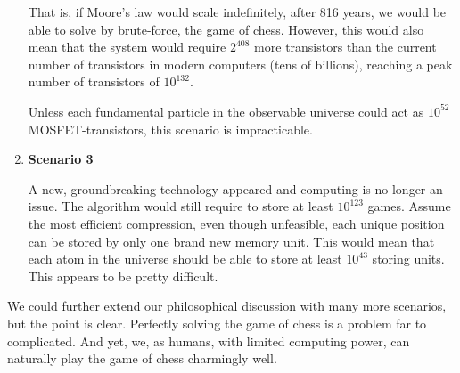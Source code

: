 \begin{enumerate}[label=\roman*]
That is, if Moore's law would scale indefinitely, after 816 years, we would be able to solve by brute-force, the game of chess. However, this would also mean that the system would require $2^{408}$ more transistors than the current number of transistors in modern computers (tens of billions), reaching a peak number of transistors of $10^{132}$. 

Unless each fundamental particle in the observable universe could act as $10^{52}$ MOSFET-transistors, this scenario is impracticable.

  \item \textbf{Scenario 3} 
  
  A new, groundbreaking technology appeared and computing is no longer an issue. The algorithm would still require to store at least $10^{123}$ games. Assume the most efficient compression, even though unfeasible, each unique position can be stored by only one brand new memory unit. This would mean that each atom in the universe should be able to store at least $10^{43}$ storing units. This appears to be pretty difficult.
\end{enumerate}

We could further extend our philosophical discussion with many more scenarios, but the point is clear. Perfectly solving the game of chess is a problem far to complicated. And yet, we, as humans, with limited computing power, can naturally play the game of chess charmingly well.